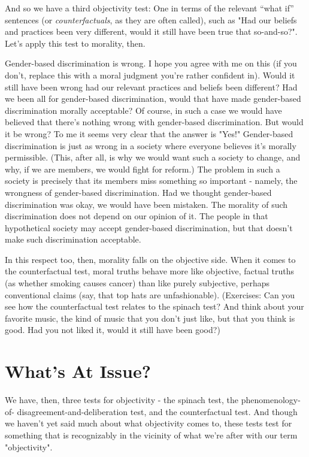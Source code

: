 And so we have a third objectivity test: One in terms of the relevant “what if” 
sentences (or \emph{counterfactuals}, as they are often called), such as "Had our beliefs and 
practices been very different, would it still have been true that so-and-so?". Let's apply 
this test to morality, then.  

Gender-based discrimination is wrong. I hope you agree with me on this (if you 
don't, replace this with a moral judgment you're rather confident in). Would it still have 
been wrong had our relevant practices and beliefs been different? Had we been all for 
gender-based discrimination, would that have made gender-based discrimination 
morally acceptable? Of course, in such a case we would have believed that there's 
nothing wrong with gender-based discrimination. But would it be wrong? To me it 
seems very clear that the answer is "Yes!" Gender-based discrimination is just as wrong 
in a society where everyone believes it's morally permissible. (This, after all, is why we 
would want such a society to change, and why, if we are members, we would fight for 
reform.) The problem in such a society is precisely that its members miss something so
important - namely, the wrongness of gender-based discrimination. Had we thought 
gender-based discrimination was okay, we would have been mistaken. The morality of 
such discrimination does not depend on our opinion of it. The people in that 
hypothetical society may accept gender-based discrimination, but that doesn’t make 
such discrimination acceptable.  

In this respect too, then, morality falls on the objective side. When it comes to 
the counterfactual test, moral truths behave more like objective, factual truths (as 
whether smoking causes cancer) than like purely subjective, perhaps conventional 
claims (say, that top hats are unfashionable).  
(Exercises: Can you see how the counterfactual test relates to the spinach test? And 
think about your favorite music, the kind of music that you don't just like, but that you 
think is good. Had you not liked it, would it still have been good?) 
 
\section{What's At Issue?}  
We have, then, three tests for objectivity - the spinach test, the phenomenology-of-
disagreement-and-deliberation test, and the counterfactual test. And though we haven't 
yet said much about what objectivity comes to, these tests test for something that is 
recognizably in the vicinity of what we're after with our term "objectivity". 


